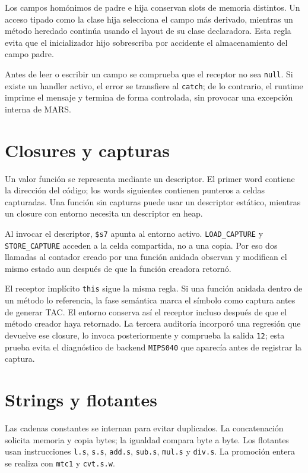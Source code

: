 \documentclass[11pt,letterpaper,oneside]{report}
\newcommand{\codigo}[1]{\texttt{#1}}
\begin{document}
Los campos hom\'onimos de padre e hija conservan slots de memoria distintos. Un acceso tipado como la clase hija selecciona el campo m\'as derivado, mientras un m\'etodo heredado contin\'ua usando el layout de su clase declaradora. Esta regla evita que el inicializador hijo sobrescriba por accidente el almacenamiento del campo padre.

Antes de leer o escribir un campo se comprueba que el receptor no sea \codigo{null}. Si existe un handler activo, el error se transfiere al \codigo{catch}; de lo contrario, el runtime imprime el mensaje y termina de forma controlada, sin provocar una excepci\'on interna de MARS.

\section{Closures y capturas}

Un valor funci\'on se representa mediante un descriptor. El primer word contiene la direcci\'on del c\'odigo; los words siguientes contienen punteros a celdas capturadas. Una funci\'on sin capturas puede usar un descriptor est\'atico, mientras un closure con entorno necesita un descriptor en heap.

Al invocar el descriptor, \codigo{\$s7} apunta al entorno activo. \codigo{LOAD\_CAPTURE} y \codigo{STORE\_CAPTURE} acceden a la celda compartida, no a una copia. Por eso dos llamadas al contador creado por una funci\'on anidada observan y modifican el mismo estado aun despu\'es de que la funci\'on creadora retorn\'o.

El receptor impl\'icito \codigo{this} sigue la misma regla. Si una funci\'on anidada dentro de un m\'etodo lo referencia, la fase sem\'antica marca el s\'imbolo como captura antes de generar TAC. El entorno conserva as\'i el receptor incluso despu\'es de que el m\'etodo creador haya retornado. La tercera auditor\'ia incorpor\'o una regresi\'on que devuelve ese closure, lo invoca posteriormente y comprueba la salida \codigo{12}; esta prueba evita el diagn\'ostico de backend \codigo{MIPS040} que aparec\'ia antes de registrar la captura.

\section{Strings y flotantes}

Las cadenas constantes se internan para evitar duplicados. La concatenaci\'on solicita memoria y copia bytes; la igualdad compara byte a byte. Los flotantes usan instrucciones \codigo{l.s}, \codigo{s.s}, \codigo{add.s}, \codigo{sub.s}, \codigo{mul.s} y \codigo{div.s}. La promoci\'on entera se realiza con \codigo{mtc1} y \codigo{cvt.s.w}.
\end{document}
